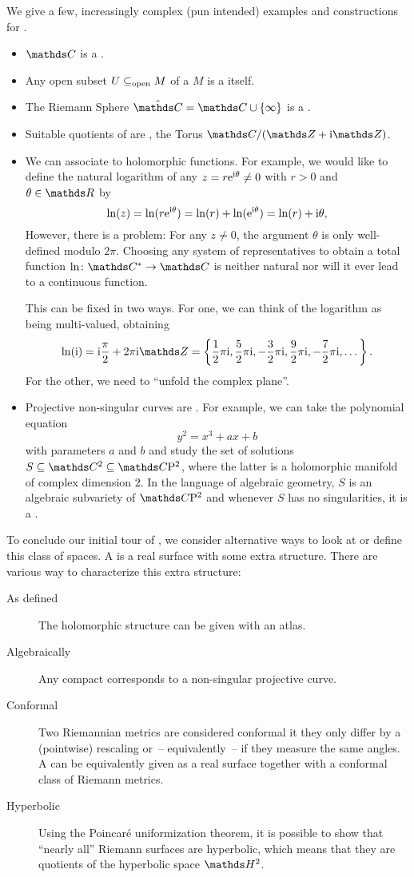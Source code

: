 \begin{bsp}
We give a few, increasingly complex (pun intended)
examples and constructions for \RSs.
\begin{itemize}
\item \(\C\) is a \RS.
\item Any open subset \(U \subseteq_{\textnormal{open}} M\) of a \RS \(M\) is a \RS itself.
\item The Riemann Sphere \(\hat\C = \C \cup \{\infty\}\) is a \RS.
\item Suitable quotients of \RSs are \RSs,
	\eg the Torus \(\C / (\Z + \i\Z)\).
\item We can associate \RSs to holomorphic functions.
	For example,
	we would like to define the natural logarithm
	of any \(z = r\mathrm{e}^{\mathrm{i}\theta} \neq 0\)
	with \(r > 0\) and \(\theta \in \R\) by
	\[
		\ln(z)
		= \ln(r\mathrm{e}^{\mathrm{i}\theta})
		= \ln(r) + \ln(\mathrm{e}^{\mathrm{i}\theta})
		= \ln(r) + \mathrm{i}\theta,
	\]
	However, there is a problem:
	For any \(z \neq 0\),
	the argument \(\theta\) is only well-defined modulo \(2\pi\).
	Choosing any system of representatives
	to obtain a total function \(\ln\colon \C^* \to \C\)
	is neither natural nor will it ever lead to a continuous function.

	This can be fixed in two ways.
	For one, we can think of the logarithm as being multi-valued,
	obtaining
	\[
		\ln(\i)
		= \i\frac\pi2+2\pi\i\Z
		= \left\{
			\frac12\pi\i, \frac52\pi\i,
			-\frac32\pi\i, \frac92\pi\i,
			-\frac72\pi\i, \dots
		\right\}.
	\]
	For the other,
	we need \RSs to “unfold the complex plane”.
\item Projective non-singular curves are \RSs.
	For example, we can take the polynomial equation
	\[y^2 = x^3+ax+b\]
	with parameters \(a\) and \(b\)
	and study the set of solutions \(S \subseteq \C^2 \subseteq \Proj\C2\),
	where the latter is a holomorphic manifold of complex dimension \(2\).
	In the language of algebraic geometry,
	\(S\) is an algebraic subvariety of \(\Proj\C2\)
	and whenever \(S\) has no singularities,
	it is a \RS.
\end{itemize}
\end{bsp}

To conclude our initial tour of \RSs,
we consider alternative ways
to look at or define this class of spaces.
A \RS is a real surface with some extra structure.
There are various way to characterize this extra structure:
\begin{description}
\item[As defined] The holomorphic structure can be given with an atlas.
\item[Algebraically] Any compact \RS
	corresponds to a non-singular projective curve.
\item[Conformal] Two Riemannian metrics are considered conformal
	it they only differ by a (pointwise) rescaling
	or~-- equivalently~-- if they measure the same angles.
	A \RS can be equivalently given
	as a real surface together with a conformal class of Riemann metrics.
\item[Hyperbolic] Using the Poincaré uniformization theorem,
	it is possible to show
	that “nearly all” Riemann surfaces are hyperbolic,
	which means that they are quotients of the hyperbolic space \(\H^2\).
\end{description}

